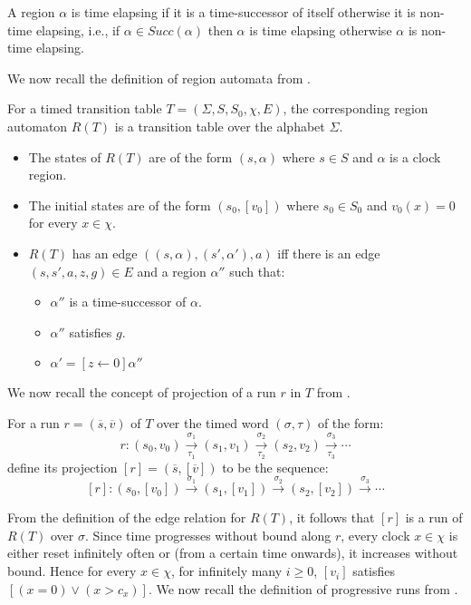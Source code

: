 A region $\alpha$ is time elapsing if it is a time-successor of itself otherwise it is non-time elapsing, i.e., if $\alpha \in Succ(\alpha)$ then $\alpha$ is time elapsing otherwise $\alpha$ is non-time elapsing.

We now recall the definition of region automata from \cite{1}.

\begin{definition}
For a timed transition table $T = (\Sigma, S, S_{0}, \chi, E)$, the corresponding region automaton $R(T)$ is a transition table over the alphabet $\Sigma$.
\begin{itemize}
\item The states of $R(T)$ are of the form $(s, \alpha)$ where $s \in S$ and $\alpha$ is a clock region.
\item The initial states are of the form $(s_{0}, [v_{0}])$ where $s_{0} \in S_{0}$ and $v_{0}(x) = 0$ for every $x \in \chi$.
\item $R(T)$ has an edge $((s, \alpha), (s', \alpha'), a)$ iff there is an edge $(s, s', a, z, g) \in E$ and a region $\alpha''$ such that:
\begin{itemize}
\item $\alpha''$ is a time-successor of $\alpha$.
\item $\alpha''$ satisfies $g$.
\item $\alpha' = [z \leftarrow 0] \alpha''$
\end{itemize}
\end{itemize}
\end{definition}

We now recall the concept of projection of a run $r$ in $T$ from \cite{1}.

\begin{definition}
For a run $r = (\overline{s}, \overline{v})$ of $T$ over the timed word $(\sigma, \tau)$ of the form:
\[r: (s_{0}, v_{0}) \overset{\sigma_{1}}{\underset{\tau_{1}}{\longrightarrow}} (s_{1}, v_{1}) \overset{\sigma_{2}}{\underset{\tau_{2}}{\longrightarrow}} (s_{2}, v_{2}) \overset{\sigma_{3}}{\underset{\tau_{3}}{\longrightarrow}} \cdots \]
define its projection $[r] = (\overline{s}, [\overline{v}])$ to be the sequence:
\[[r]: (s_{0}, [v_{0}]) \overset{\sigma_{1}}{\longrightarrow} (s_{1}, [v_{1}]) \overset{\sigma_{2}}{\longrightarrow} (s_{2}, [v_{2}]) \overset{\sigma_{3}}{\longrightarrow} \cdots \]
\end{definition}

From the definition of the edge relation for $R(T)$, it follows that $[r]$ is a run of $R(T)$ over $\sigma$. Since time progresses without bound along $r$, every clock $x \in \chi$ is either reset infinitely often or (from a certain time onwards), it increases without bound. Hence for every $x \in \chi$, for infinitely many $i \geq 0$, $[v_{i}]$ satisfies $[(x = 0) \vee (x > c_{x})]$. We now recall the definition of progressive runs from \cite{1}.

